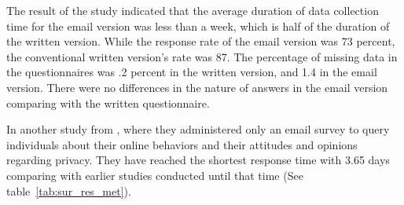 The result of the study indicated that the average duration of data collection time for the email version was less than a week, which is half of the duration of the written version. While the response rate of the email version was 73 percent, the conventional written version's rate was 87. The percentage of missing data in the questionnaires was .2 percent in the written version, and 1.4 in the email version. There were no differences in the nature of answers in the email version comparing with the written questionnaire.
\vspace{1cm}

In another study from \cite{Sheehan2006}, where they administered only an email survey to query individuals about their online behaviors and their attitudes and opinions regarding privacy. They have reached the shortest response time with 3.65 days comparing with earlier studies conducted until that time (See table~\ref{tab:sur_res_met}).

